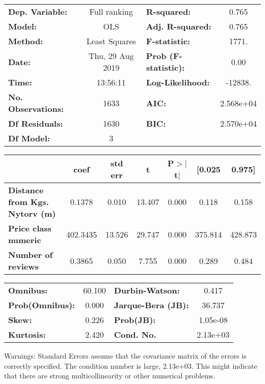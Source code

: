 \documentclass{report}
\begin{document}
\begin{center}
\begin{tabular}{lclc}
\toprule
\textbf{Dep. Variable:}                &   Full ranking   & \textbf{  R-squared:         } &     0.765   \\
\textbf{Model:}                        &       OLS        & \textbf{  Adj. R-squared:    } &     0.765   \\
\textbf{Method:}                       &  Least Squares   & \textbf{  F-statistic:       } &     1771.   \\
\textbf{Date:}                         & Thu, 29 Aug 2019 & \textbf{  Prob (F-statistic):} &     0.00    \\
\textbf{Time:}                         &     13:56:11     & \textbf{  Log-Likelihood:    } &   -12838.   \\
\textbf{No. Observations:}             &        1633      & \textbf{  AIC:               } & 2.568e+04   \\
\textbf{Df Residuals:}                 &        1630      & \textbf{  BIC:               } & 2.570e+04   \\
\textbf{Df Model:}                     &           3      & \textbf{                     } &             \\
\bottomrule
\end{tabular}
\begin{tabular}{lcccccc}
                                       & \textbf{coef} & \textbf{std err} & \textbf{t} & \textbf{P$>$$|$t$|$} & \textbf{[0.025} & \textbf{0.975]}  \\
\midrule
\textbf{Distance from Kgs. Nytorv (m)} &       0.1378  &        0.010     &    13.407  &         0.000        &        0.118    &        0.158     \\
\textbf{Price class numeric}           &     402.3435  &       13.526     &    29.747  &         0.000        &      375.814    &      428.873     \\
\textbf{Number of reviews}             &       0.3865  &        0.050     &     7.755  &         0.000        &        0.289    &        0.484     \\
\bottomrule
\end{tabular}
\begin{tabular}{lclc}
\textbf{Omnibus:}       & 60.100 & \textbf{  Durbin-Watson:     } &    0.417  \\
\textbf{Prob(Omnibus):} &  0.000 & \textbf{  Jarque-Bera (JB):  } &   36.737  \\
\textbf{Skew:}          &  0.226 & \textbf{  Prob(JB):          } & 1.05e-08  \\
\textbf{Kurtosis:}      &  2.420 & \textbf{  Cond. No.          } & 2.13e+03  \\
\bottomrule
\end{tabular}
\end{center}

Warnings: \newline
 [1] Standard Errors assume that the covariance matrix of the errors is correctly specified. \newline
 [2] The condition number is large, 2.13e+03. This might indicate that there are \newline
 strong multicollinearity or other numerical problems.
\end{document}
